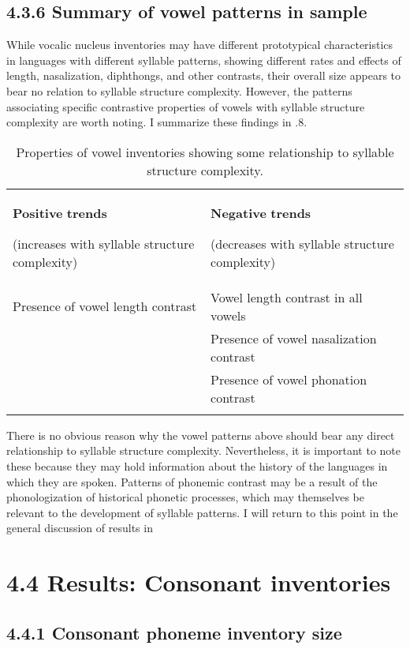 \subsection{4.3.6 Summary of vowel patterns in sample}

  While vocalic nucleus inventories may have different prototypical characteristics in languages with different syllable patterns, showing different rates and effects of length, nasalization, diphthongs, and other contrasts, their overall size appears to bear no relation to syllable structure complexity. However, the patterns associating specific contrastive properties of vowels with syllable structure complexity are worth noting. I summarize these findings in .8.

\begin{table}
\begin{tabularx}{\textwidth}{XX}
\lsptoprule

\textbf{Positive} \textbf{trends}

(increases with syllable structure complexity) & \textbf{Negative} \textbf{trends}

(decreases with syllable structure complexity)\\
Presence of vowel length contrast & Vowel length contrast in all vowels\\
& Presence of vowel nasalization contrast\\
& Presence of vowel phonation contrast\\
\lspbottomrule
\end{tabularx}
\caption{\label{4.8}Properties of vowel inventories showing some relationship to syllable structure complexity.}
\end{table}

  There is no obvious reason why the vowel patterns above should bear any direct relationship to syllable structure complexity. Nevertheless, it is important to note these because they may hold information about the history of the languages in which they are spoken. Patterns of phonemic contrast may be a result of the phonologization of historical phonetic processes, which may themselves be relevant to the development of syllable patterns. I will return to this point in the general discussion of results in 

\section{4.4 Results: Consonant inventories}
\subsection{4.4.1 Consonant phoneme inventory size}

